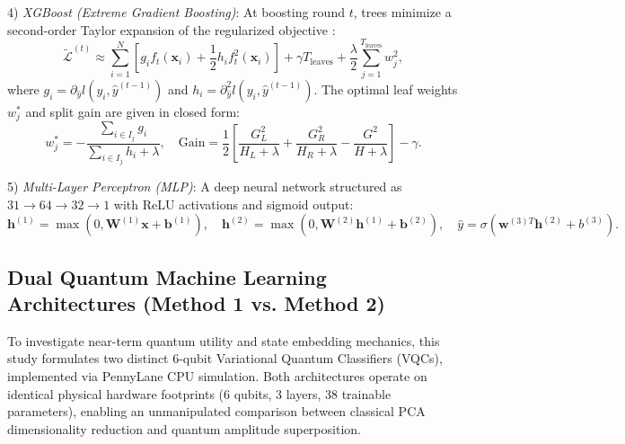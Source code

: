 \documentclass{ieeeaccess}
\begin{document}
4) \textit{XGBoost (Extreme Gradient Boosting)}: At boosting round $t$, trees minimize a second-order Taylor expansion of the regularized objective \cite{chen2016xgboost}:
\begin{equation}
\tilde{\mathcal{L}}^{(t)} \approx \sum_{i=1}^N \left[ g_i f_t(\mathbf{x}_i) + \frac{1}{2} h_i f_t^2(\mathbf{x}_i) \right] + \gamma T_{\text{leaves}} + \frac{\lambda}{2} \sum_{j=1}^{T_{\text{leaves}}} w_j^2,
\label{eq:xgboost_obj}
\end{equation}
where $g_i = \partial_{\hat{y}} l(y_i, \hat{y}^{(t-1)})$ and $h_i = \partial^2_{\hat{y}} l(y_i, \hat{y}^{(t-1)})$. The optimal leaf weights $w_j^*$ and split gain are given in closed form:
\begin{equation}
w_j^* = -\frac{\sum_{i \in I_j} g_i}{\sum_{i \in I_j} h_i + \lambda}, \quad \text{Gain} = \frac{1}{2}\left[ \frac{G_L^2}{H_L + \lambda} + \frac{G_R^2}{H_R + \lambda} - \frac{G^2}{H + \lambda} \right] - \gamma.
\label{eq:xgboost_gain}
\end{equation}

5) \textit{Multi-Layer Perceptron (MLP)}: A deep neural network structured as $31 \to 64 \to 32 \to 1$ with ReLU activations and sigmoid output:
\begin{equation}
\mathbf{h}^{(1)} = \max(0, \mathbf{W}^{(1)} \mathbf{x} + \mathbf{b}^{(1)}), \quad \mathbf{h}^{(2)} = \max(0, \mathbf{W}^{(2)} \mathbf{h}^{(1)} + \mathbf{b}^{(2)}), \quad \hat{y} = \sigma(\mathbf{w}^{(3)T} \mathbf{h}^{(2)} + b^{(3)}).
\label{eq:mlp}
\end{equation}

\subsection{Dual Quantum Machine Learning Architectures (Method 1 vs. Method 2)}
To investigate near-term quantum utility and state embedding mechanics, this study formulates two distinct 6-qubit Variational Quantum Classifiers (VQCs), implemented via PennyLane \cite{bergholm2018pennylane} CPU simulation. Both architectures operate on identical physical hardware footprints (6 qubits, 3 layers, 38 trainable parameters), enabling an unmanipulated comparison between classical PCA dimensionality reduction and quantum amplitude superposition.
\end{document}
